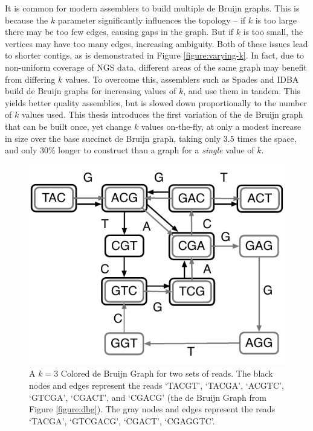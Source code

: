\documentclass[a4paper,11pt]{article}
\begin{document}
It is common for modern assemblers to build multiple de Bruijn graphs. This is because the $k$ parameter significantly influences the topology -- if $k$ is too large there may be too few edges, causing gaps in the graph. But if $k$ is too small, the vertices may have too many edges, increasing ambiguity. Both of these issues lead to shorter contigs, as is demonstrated in Figure \ref{figure:varying-k}. In fact, due to non-uniform coverage of NGS data, different areas of the same graph may benefit from differing $k$ values. To overcome this, assemblers such as Spades and IDBA build de Bruijn graphs for increasing values of $k$, and use them in tandem. This yields better quality assemblies, but is slowed down proportionally to the number of $k$ values used. This thesis introduces the first variation of the de Bruijn graph that can be built once, yet change $k$ values on-the-fly, at only a modest increase in size over the base succinct de Bruijn graph, taking only $3.5$ times the space, and only $30\%$ longer to construct than a graph for a \emph{single} value of $k$.

\begin{figure}
	\begin{center}
		\includegraphics*[scale=0.8]{images/cdbg.pdf}
		\caption{A $k=3$ Colored de Bruijn Graph for two sets of reads. The black nodes and edges represent the reads `TACGT', `TACGA', `ACGTC', `GTCGA', `CGACT', and `CGACG' (the de Bruijn Graph from Figure \ref{figure:dbg}). The gray nodes and edges represent the reads `TACGA', `GTCGACG', `CGACT', `CGAGGTC'.}
		\label{figure:cdbg}
	\end{center}
\end{figure}
\end{document}
